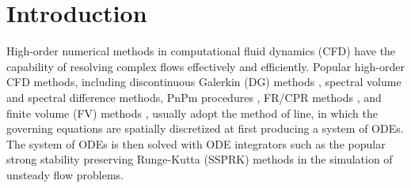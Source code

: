 
\section{Introduction}
\label{sec:intro}

High-order numerical methods in computational fluid dynamics (CFD)
have the capability of
resolving complex flows effectively and efficiently.
Popular high-order CFD methods, including discontinuous
Galerkin (DG) methods
\cite{reed1973triangularDG,
    BASSI1997251DG,
    BASSI1997267DG,
    cockburn1989DGII,
    cockburn2001rungeDG},
spectral volume
\cite{WANG2002210_SV}
and spectral difference
\cite{LIU2006780_SD} methods,
PnPm procedures
\cite{DUMBSER20088209_PNPM},
FR/CPR methods
\cite{huynh2007flux_FR,
    huynh2009reconstruction_FR,
    vincent2011new_FR,
    wang2009unifying_CPR},
and finite volume (FV) methods
\cite{wang2016compact_VR,
    wang2016compact1_VR,
    wang2017compact_VR,
    pan2018high_VR,
    zhang2019compact_VR,
    barth1990higher_FV,
    delanaye1999quadratic_FV,
    ollivier1997quasi_ENO,
    friedrich1998weighted_WENO,
    hu1999weighted_WENO,
    dumbser2007quadrature_WENO},
usually adopt the method of line,
in which the governing equations
are spatially discretized at first
producing a system of ODEs.
The system of ODEs is then
solved with
ODE integrators such as the
popular strong stability preserving
Runge-Kutta (SSPRK) methods
\cite{gottlieb2001strong_SSPRK} in the simulation
of unsteady flow problems.

